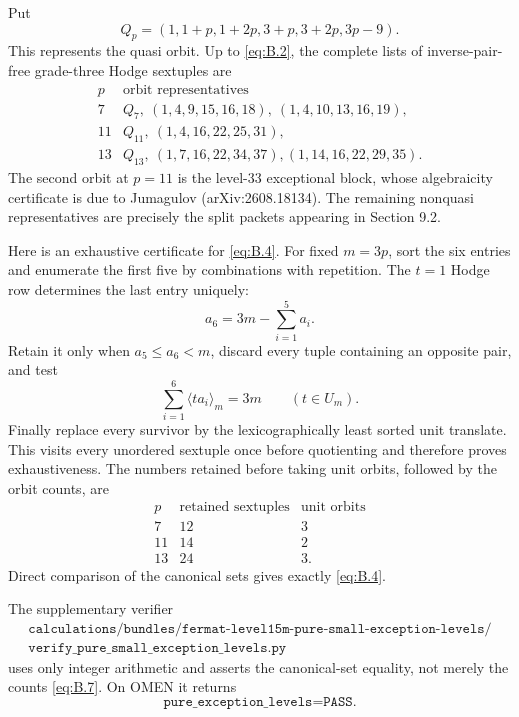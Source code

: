 \documentclass[11pt]{amsart}
\numberwithin{theorem}{section}
\theoremstyle{remark}
\numberwithin{equation}{section}
\begin{document}
Put
\[
 Q_p=(1,1+p,1+2p,3+p,3+2p,3p-9).
 \tag{B.3}\label{eq:B.3}
\]
This represents the quasi orbit. Up to \eqref{eq:B.2}, the complete lists of
inverse-pair-free grade-three Hodge sextuples are
\[
\begin{array}{c|l}
p&\text{orbit representatives}\\ \hline
7&
Q_7,\ (1,4,9,15,16,18),\ (1,4,10,13,16,19),\\
11&
Q_{11},\ (1,4,16,22,25,31),\\
13&
Q_{13},\ (1,7,16,22,34,37),
(1,14,16,22,29,35).
\end{array}
\tag{B.4}\label{eq:B.4}
\]
The second orbit at \(p=11\) is the level-33 exceptional block, whose
algebraicity certificate is due to Jumagulov \cite[Theorem 1.4, p.~5]{jumagulov2026}
(arXiv:2608.18134). The remaining
nonquasi representatives are precisely the split packets appearing in
Section 9.2.

Here is an exhaustive certificate for \eqref{eq:B.4}. For fixed \(m=3p\), sort the
six entries and enumerate the first five by combinations with repetition.
The \(t=1\) Hodge row determines the last entry uniquely:
\[
 a_6=3m-\sum_{i=1}^5a_i.
 \tag{B.5}\label{eq:B.5}
\]
Retain it only when \(a_5\le a_6<m\), discard every tuple containing an
opposite pair, and test
\[
 \sum_{i=1}^6\langle ta_i\rangle_m=3m
 \qquad(t\in U_m).
 \tag{B.6}\label{eq:B.6}
\]
Finally replace every survivor by the lexicographically least sorted unit
translate. This visits every unordered sextuple once before quotienting and
therefore proves exhaustiveness. The numbers retained before taking unit
orbits, followed by the orbit counts, are
\[
\begin{array}{c|c|c}
p&\text{retained sextuples}&\text{unit orbits}\\ \hline
7&12&3\\
11&14&2\\
13&24&3.
\end{array}
\tag{B.7}\label{eq:B.7}
\]
Direct comparison of the canonical sets gives exactly \eqref{eq:B.4}.

The supplementary verifier
\[
\begin{gathered}
\texttt{calculations/bundles/fermat-level15m-pure-small-exception-levels/}\\
\texttt{verify\_pure\_small\_exception\_levels.py}
\end{gathered}
\]
uses only integer arithmetic and asserts the canonical-set equality, not
merely the counts \eqref{eq:B.7}. On OMEN it returns
\[
\texttt{pure\_exception\_levels=PASS}.
\]
\end{document}
